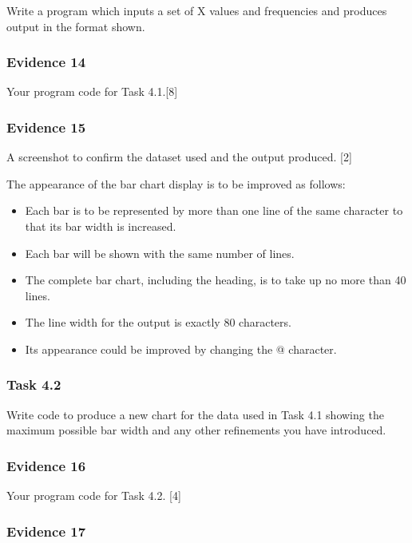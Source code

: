 Write a program which inputs a set of X values and frequencies and
produces output in the format shown.

\subsubsection*{Evidence 14}

Your program code for Task 4.1.\hfill{}{[}8{]}

\subsubsection*{Evidence 15}

A screenshot to confirm the dataset used and the output produced.
\hfill{}{[}2{]}

The appearance of the bar chart display is to be improved as follows:
\begin{itemize}
\item Each bar is to be represented by more than one line of the same character
to that its bar width is increased. 
\item Each bar will be shown with the same number of lines. 
\item The complete bar chart, including the heading, is to take up no more
than 40 lines. 
\item The line width for the output is exactly 80 characters. 
\item Its appearance could be improved by changing the @ character.
\end{itemize}

\subsubsection*{Task 4.2}

Write code to produce a new chart for the data used in Task 4.1 showing
the maximum possible bar width and any other refinements you have
introduced.

\subsubsection*{Evidence 16}

Your program code for Task 4.2. \hfill{}{[}4{]}

\subsubsection*{Evidence 17}

